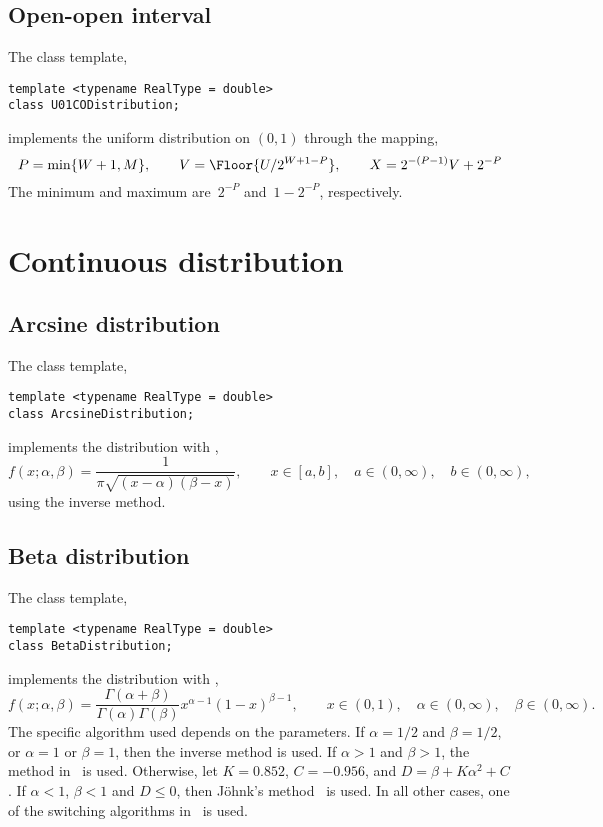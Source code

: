 \subsection{Open-open interval}
\label{sub:Open-open interval}

The class template,
\begin{verbatim}
template <typename RealType = double>
class U01CODistribution;
\end{verbatim}
implements the uniform distribution on $(0, 1)$ through the mapping,
\begin{equation*}
  P = \min\{W + 1, M\},\qquad
  V = \Floor{U / 2^{W + 1 - P}},\qquad
  X = 2^{-(P - 1)} V + 2^{-P}
\end{equation*}
The minimum and maximum are~$2^{-P}$ and~$1 - 2^{-P}$, respectively.

\section{Continuous distribution}
\label{sec:Continuous distribution}

\subsection{Arcsine distribution}
\label{sub:Arcsine distribution}

The class template,
\begin{verbatim}
template <typename RealType = double>
class ArcsineDistribution;
\end{verbatim}
implements the distribution with \pdf,
\begin{equation*}
  f(x;\alpha,\beta) = \frac{1}{\pi\sqrt{(x - \alpha)(\beta - x)}},\qquad
  x \in [a, b],\quad a \in (0,\infty),\quad b \in (0,\infty),
\end{equation*}
using the inverse method.

\subsection{Beta distribution}
\label{sub:Beta distribution}

The class template,
\begin{verbatim}
template <typename RealType = double>
class BetaDistribution;
\end{verbatim}
implements the distribution with \pdf,
\begin{equation*}
  f(x;\alpha,\beta) =
  \frac{\Gamma(\alpha + \beta)}{\Gamma(\alpha)\Gamma(\beta)}
  x^{\alpha - 1}(1 - x)^{\beta - 1},\qquad
  x \in (0, 1),\quad \alpha \in (0,\infty),\quad \beta \in (0,\infty).
\end{equation*}
The specific algorithm used depends on the parameters. If $\alpha = 1/2$ and
$\beta = 1/2$, or $\alpha = 1$ or $\beta = 1$, then the inverse method is used.
If $\alpha > 1$ and $\beta > 1$, the method in~\cite{Cheng:1978jl} is used.
Otherwise, let $K = 0.852$, $C = -0.956$, and $D = \beta + K\alpha^2 + C$. If
$\alpha < 1$, $\beta < 1$ and $D \le 0$, then Jöhnk's
method~\cite[sec.~3.5]{Devroye:1986gi} is used. In all other cases, one of the
switching algorithms in~\cite{Atkinson:1979es} is used.


